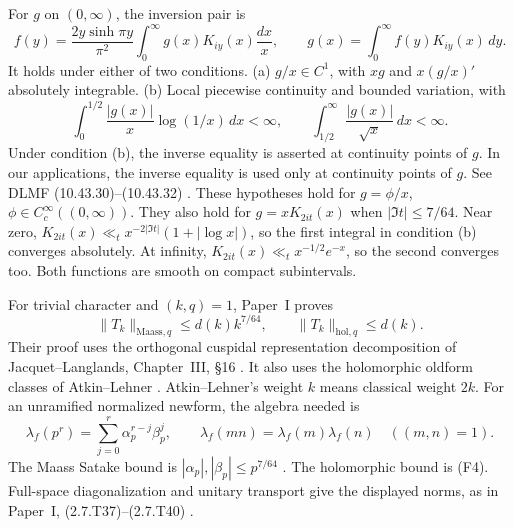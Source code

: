 \begin{fact}\label{fact:kl-inversion}
For $g$ on $(0,\infty)$, the inversion pair is
\[
 f(y)=\frac{2y\sinh\pi y}{\pi^2}\int_0^\infty g(x)K_{iy}(x)\frac{dx}x,
 \qquad g(x)=\int_0^\infty f(y)K_{iy}(x)\,dy.
\]
It holds under either of two conditions.
(a) $g/x\in C^1$, with $xg$ and $x(g/x)'$ absolutely integrable.
(b) Local piecewise continuity and bounded variation, with
\[
 \int_0^{1/2}\frac{|g(x)|}x\log(1/x)\,dx<\infty,\qquad
 \int_{1/2}^\infty\frac{|g(x)|}{\sqrt x}\,dx<\infty.
\]
Under condition (b), the inverse equality is asserted at continuity points of $g$.
In our applications, the inverse equality is used only at continuity points
of $g$.
See DLMF (10.43.30)--(10.43.32)
\cite[(10.43.30)--(10.43.32)]{DLMF}.
These hypotheses hold for $g=\phi/x$, $\phi\in C_c^\infty((0,\infty))$.
They also hold for $g=xK_{2it}(x)$ when $|\Im t|\le7/64$.
Near zero, $K_{2it}(x)\ll_t x^{-2|\Im t|}(1+|\log x|)$,
so the first integral in condition (b) converges absolutely.
At infinity, $K_{2it}(x)\ll_t x^{-1/2}e^{-x}$, so the second converges too.
Both functions are smooth on compact subintervals.
\end{fact}

\begin{fact}\label{fact:hecke-full-space}
For trivial character and $(k,q)=1$, Paper~I proves
\[
 \|T_k\|_{\mathrm{Maass},q}\le d(k)k^{7/64},\qquad
 \|T_k\|_{\mathrm{hol},q}\le d(k).
\]
Their proof uses the orthogonal cuspidal representation
decomposition of Jacquet--Langlands, Chapter~III, \S16
\cite[Chapter~III, \S16]{JacquetLanglands1970}.
It also uses the holomorphic oldform classes of Atkin--Lehner
\cite[Lemmas~6, 13--15; Theorems~3(i), 5]{AtkinLehner1970}.
Atkin--Lehner's weight $k$ means classical weight $2k$.
For an unramified normalized newform, the algebra needed is
\[
 \lambda_f(p^r)=\sum_{j=0}^r\alpha_p^{r-j}\beta_p^j,\qquad
 \lambda_f(mn)=\lambda_f(m)\lambda_f(n)\quad((m,n)=1).
\]
The Maass Satake bound is $|\alpha_p|,|\beta_p|\le p^{7/64}$
\cite[Appendix~2]{KimSarnak2003}.
The holomorphic bound is (F4). Full-space diagonalization and unitary
transport give the displayed norms, as in Paper~I, (2.7.T37)--(2.7.T40)
\cite[(2.7.T37)--(2.7.T40), pp.~21--22]{PaperI}.
\end{fact}

